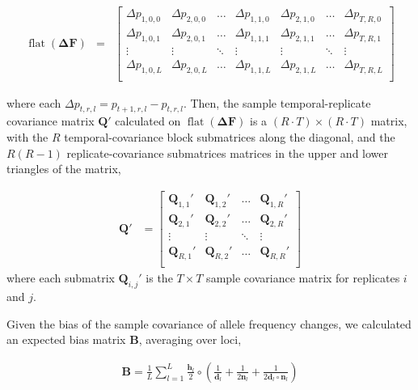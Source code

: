 \documentclass[11pt]{article}
\DeclareMathOperator{\flt}{\mathrm{flat}}
\begin{document}
\begin{align}
    \flt(\mathbf{\Delta F}) &=
                    &\begin{bmatrix} 
    \Delta p_{1, 0, 0} & \Delta p_{2, 0, 0} & \ldots & \Delta p_{1, 1, 0} & \Delta p_{2, 1, 0} & \ldots & \Delta p_{T, R, 0}  \\
    \Delta p_{1, 0, 1} & \Delta p_{2, 0, 1} & \ldots & \Delta p_{1, 1, 1} & \Delta p_{2, 1, 1} & \ldots & \Delta p_{T, R, 1}  \\
    \vdots & \vdots & \ddots & \vdots & \vdots & \ddots & \vdots  \\
    \Delta p_{1, 0, L} & \Delta p_{2, 0, L} & \ldots & \Delta p_{1, 1, L} & \Delta p_{2, 1, L} & \ldots & \Delta p_{T, R, L}  \\
  \end{bmatrix} 
\end{align}

where each $\Delta p_{t, r, l} = p_{t+1, r, l} - p_{t, r, l}$. Then, the sample
temporal-replicate covariance matrix $\mathbf{Q}'$ calculated on
$\flt(\mathbf{\Delta F})$ is a $(R \cdot T) \times (R \cdot T)$ matrix, with
the $R$ temporal-covariance block submatrices along the diagonal, and the
$R(R-1)$ replicate-covariance submatrices matrices in the upper and lower
triangles of the matrix,

\begin{align}
	\mathbf{Q}' &= 
  \begin{bmatrix} 
		\mathbf{Q}_{1,1}' & \mathbf{Q}_{1, 2}' & \ldots & \mathbf{Q}_{1, R}' \\ 
		\mathbf{Q}_{2,1}' & \mathbf{Q}_{2, 2}' & \ldots & \mathbf{Q}_{2, R}' \\ 
		\vdots & \vdots & \ddots & \vdots \\
		\mathbf{Q}_{R,1}' & \mathbf{Q}_{R, 2}' & \ldots & \mathbf{Q}_{R, R}' \\ 
  \end{bmatrix} 
\end{align}
%
where each submatrix $\mathbf{Q}_{i,j}'$ is the $T \times T$ sample covariance
matrix for replicates $i$ and $j$.  

Given the bias of the sample covariance of allele frequency changes, we
calculated an expected bias matrix $\mathbf{B}$, averaging over loci,

\begin{align}
  \mathbf{B} = \frac{1}{L} \sum_{l=1}^L \frac{\mathbf{h}_l}{2} \circ \left( \frac{1}{\mathbf{d}_l} + \frac{1}{2\mathbf{n}_l} + \frac{1}{2\mathbf{d}_l \circ \mathbf{n}_l} \right)
\end{align}
\end{document}
